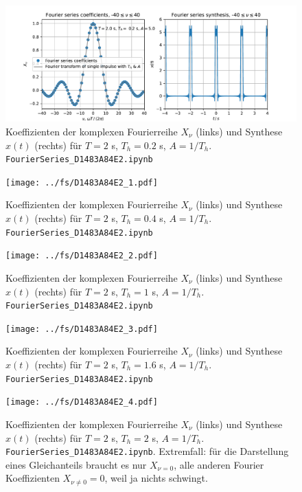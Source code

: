 \begin{figure}
\includegraphics[width=\textwidth]{../fs/D1483A84E2_0.pdf}
\caption{Koeffizienten der komplexen Fourierreihe $X_\nu$ (links) und Synthese $x(t)$ (rechts) für
$T=2$ s, $T_h=0.2$ s, $A=1/T_h$. \texttt{FourierSeries\_D1483A84E2.ipynb}}
\label{fig:D1483A84E2_0}
\end{figure}

\begin{figure}
\texttt{[image: ../fs/D1483A84E2\_1.pdf]}
\caption{Koeffizienten der komplexen Fourierreihe $X_\nu$ (links) und Synthese $x(t)$ (rechts) für
$T=2$ s, $T_h=0.4$ s, $A=1/T_h$. \texttt{FourierSeries\_D1483A84E2.ipynb}}
\label{fig:D1483A84E2_1}
\end{figure}

\begin{figure}
\texttt{[image: ../fs/D1483A84E2\_2.pdf]}
\caption{Koeffizienten der komplexen Fourierreihe $X_\nu$ (links) und Synthese $x(t)$ (rechts) für
$T=2$ s, $T_h=1$ s, $A=1/T_h$. \texttt{FourierSeries\_D1483A84E2.ipynb}}
\label{fig:D1483A84E2_2}
\end{figure}

\begin{figure}
\texttt{[image: ../fs/D1483A84E2\_3.pdf]}
\caption{Koeffizienten der komplexen Fourierreihe $X_\nu$ (links) und Synthese $x(t)$ (rechts) für
$T=2$ s, $T_h=1.6$ s, $A=1/T_h$. \texttt{FourierSeries\_D1483A84E2.ipynb}}
\label{fig:D1483A84E2_3}
\end{figure}

\begin{figure}
\texttt{[image: ../fs/D1483A84E2\_4.pdf]}
\caption{Koeffizienten der komplexen Fourierreihe $X_\nu$ (links) und Synthese $x(t)$ (rechts) für
$T=2$ s, $T_h=2$ s, $A=1/T_h$. \texttt{FourierSeries\_D1483A84E2.ipynb}. Extremfall: für die
Darstellung eines Gleichanteils braucht es nur $X_{\nu=0}$, alle anderen Fourier Koeffizienten
$X_{\nu \neq 0}=0$, weil ja nichts schwingt.}
\label{fig:D1483A84E2_4}
\end{figure}











